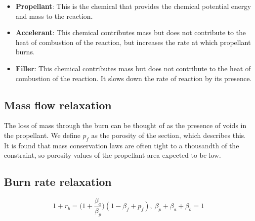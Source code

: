 \begin{itemize}
    \item \textbf{Propellant}: This is the chemical that
    provides the chemical potential energy and mass to the reaction.
    \item \textbf{Accelerant}: This chemical contributes mass but does not contribute
    to the heat of combustion of the reaction, but increases the rate at which
    propellant burns.
    \item \textbf{Filler}: This chemical contributes mass but does not contribute
    to the heat of combustion of the reaction. It slows down the rate of reaction by
    its presence.
\end{itemize}

\subsection{Mass flow relaxation}

The loss of mass through the burn can be thought of as the presence of voids in the
propellant. We define $p_f$ as the porosity of the section, which describes this.
It is found that mass conservation laws are often tight to a thousandth of the constraint,
so porosity values of the propellant area expected to be low.

\subsection{Burn rate relaxation}

\begin{equation}
    1 + r_b = \Big(1+\frac{\beta_a}{\beta_p}\Big) (1-\beta_f + p_f),~\beta_p + \beta_a + \beta_b = 1
\end{equation}



